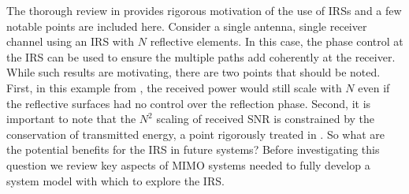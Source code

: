 The thorough review in \cite{basar2019wireless} provides rigorous motivation of the use of IRSs and a few notable points are included here.
Consider a single antenna, single receiver channel using an IRS with $N$ reflective elements. In this case, the phase control at the IRS can be used to ensure the multiple paths add coherently at the receiver. While such results are motivating, there are two points that should be noted. First, in this example from \cite{basar2019wireless}, the received power would still scale with $N$ even if the reflective surfaces had no control over the reflection phase. Second, it is important to note that the $N^2$ scaling of received SNR is constrained by the conservation of transmitted energy, a point rigorously treated in \cite{bjornson2019demystifying}.
So what are the potential benefits for the IRS in future systems?
Before investigating this question we review key aspects of MIMO systems needed to fully develop a system model with which to explore the IRS. 